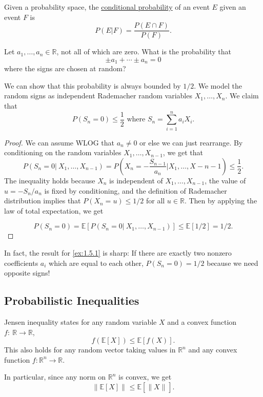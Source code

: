 Given a probability space, the \underline{conditional probability} of an event $E$ given an event $F$ 
is 
\[ P(E|F) = \frac{P(E \cap F)}{P(F)}. \]

\begin{example}
\label{ex:1.5.1}
Let $a_1, \dots, a_n \in \mathbb{R}$, not all of which are zero. What is the probability that 
\[ \pm a_1 + \cdots \pm a_n = 0 \]
where the signs are chosen at random?

We can show that this probability is always bounded by $1/2$. We model the random signs as independent 
Rademacher random variables $X_1, \dots, X_n$. We claim that 
\[ P(S_n = 0) \leq \frac{1}{2} \text{ where } S_n = \sum_{i = 1}^{n} a_i X_i. \]
\end{example}

\begin{proof}
We can assume WLOG that $a_n \neq 0$ or else we can just rearrange. By conditioning on the random variables 
$X_1, \dots, X_{n - 1}$, we get that 
\[ P(S_n = 0 | \ X_1, \dots, X_{n - 1}) 
= P \left( X_n = -\frac{S_{n - 1}}{a_n} \bigg| X_1, \dots, X-{n - 1} \right) \leq \frac{1}{2}. \]
The inequality holds because $X_n$ is independent of $X_1, \dots, X_{n - 1}$, the value of $u = -S_n / a_n$ 
is fixed by conditioning, and the definition of Rademacher distribution implies that $P(X_n = u) \leq 1/2$ 
for all $u \in \mathbb{R}$. Then by applying the law of total expectation, we get 

\[ P(S_n = 0) = \mathbb{E}[P(S_n = 0 | \ X_1, \dots, X_{n - 1})] \leq \mathbb{E}[1/2] = 1/2. \]
\end{proof}
In fact, the result for \cref{ex:1.5.1} is sharp: If there are exactly two nonzero coefficients $a_i$ which 
are equal to each other, $P(S_n = 0) = 1/2$ because we need opposite signs!



\subsection{Probabilistic Inequalities}
Jensen inequality states for any random variable $X$ and a convex function $f: \ \mathbb{R} \to \mathbb{R}$, 
\[ f(\mathbb{E}[X]) \leq \mathbb{E}[f(X)]. \]
This also holds for any random vector taking values in $\mathbb{R}^n$ and any convex function 
$f: \mathbb{R}^n \to \mathbb{R}$.

In particular, since any norm on $\mathbb{R}^n$ is convex, we get
\[ \lVert \mathbb{E}[X] \rVert_{} \leq \mathbb{E}[\lVert X \rVert_{}]. \]

